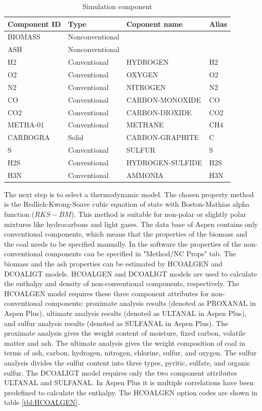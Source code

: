 \begin{table}[h!]
	\centering
	{\small{
	\begin{tabular}{ l|l|l|l } 
		\hline
		Component ID&	Type			&	Coponent name	&	Alias\\
		\hline 													
		BIOMASS		&	Nonconventional	&					&		\\		
		ASH			&	Nonconventional	&					&		\\
		H2			&	Conventional	&	HYDROGEN		&	H2	\\
		O2			&	Conventional	&	OXYGEN			&	O2	\\
		N2			&	Conventional	&	NITROGEN		&	N2	\\
		CO			&	Conventional	&	CARBON-MONOXIDE	&	CO	\\
		CO2			&	Conventional	&	CARBON-DIOXIDE	&	CO2	\\
		METHA-01	&	Conventional	&	METHANE			&	CH4	\\
		CARBOGRA	&	Solid			&	CARBON-GRAPHITE	&	C	\\
		S			&	Conventional	&	SULFUR			&	S 	\\
		H2S			&	Conventional	&	HYDROGEN-SULFIDE&	H2S	\\
		H3N			&	Conventional	&	AMMONIA			&	H3N \\
		\hline
	\end{tabular}}}
	\caption{Simulation component}
	\label{tbl:Gasification_Components}
\end{table}

The next step is to select a thermodynamic model. The chosen property method is the Redlich-Kwong-Soave cubic equation of state with Boston-Mathias alpha function ($RKS-BM$). This method is suitable for non-polar or slightly polar mixtures like hydrocarbons and light gases. The data base of Aspen contains only conventional components, which means that the properties of the biomass and the coal needs to be specified manually. In the software the properties of the non-conventional components can be specified in "Method/NC Props" tab. The biomass and the ash properties can be estimated by HCOALGEN and DCOALIGT models. HCOALGEN and DCOALIGT models are used to calculate the enthalpy and density of non-conventional components, respectively. The HCOALGEN model requires these three component attributes for non-conventional components: proximate analysis results (denoted as PROXANAL in Aspen Plus), ultimate analysis results (denoted as ULTANAL in Aspen Plus), and sulfur analysis results (denoted as SULFANAL in Aspen Plus). The proximate analysis gives the weight content of moisture, fixed carbon, volatile matter and ash. The ultimate analysis gives the weight composition of coal in terms of ash, carbon, hydrogen, nitrogen, chlorine, sulfur, and oxygen. The sulfur analysis divides the sulfur content into three types, pyritic, sulfate, and organic sulfur. The DCOALIGT model requires only the two component attributes ULTANAL and SULFANAL. In Aspen Plus it is multiple correlations have been predefined to calculate the enthalpy. The HCOALGEN option codes are shown in table \ref{tbl:HCOALGEN}. 

